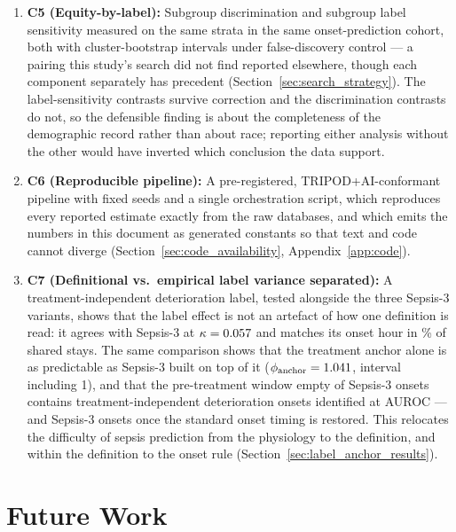 \begin{enumerate}
    \item \textbf{C5 (Equity-by-label):} Subgroup discrimination and subgroup
    label sensitivity measured on the same strata in the same
    onset-prediction cohort, both with cluster-bootstrap intervals under
    false-discovery control --- a pairing this study's search did not find
    reported elsewhere, though each component separately has precedent
    (Section~\ref{sec:search_strategy}). The label-sensitivity contrasts
    survive correction and the discrimination contrasts do not, so the
    defensible finding is about the completeness of the demographic record
    rather than about race; reporting either analysis without the other would
    have inverted which conclusion the data support.

    \item \textbf{C6 (Reproducible pipeline):} A pre-registered,
    TRIPOD+AI-conformant pipeline with fixed seeds and a single orchestration
    script, which reproduces every reported estimate exactly from the raw
    databases, and which emits the numbers in this document as generated
    constants so that text and code cannot diverge
    (Section~\ref{sec:code_availability}, Appendix~\ref{app:code}).

    \item \textbf{C7 (Definitional vs.\ empirical label variance separated):}
    A treatment-independent deterioration label, tested alongside the three
    Sepsis-3 variants, shows that the label effect is not an artefact of how one
    definition is read: it agrees with Sepsis-3 at $\kappa = 0.057$ and
    matches its onset hour in \pcPctExactMatchD\% of shared stays. The same
    comparison shows that the treatment anchor alone is as predictable as
    Sepsis-3 built on top of it ($\phi_{\text{anchor}} = 1.041$,
    interval including 1), and that the pre-treatment window empty of Sepsis-3
    onsets contains
    \pcPreTreatOnsetsVarD{} treatment-independent deterioration onsets
    identified at \pcPreTreatAurocPrimaryD{} AUROC --- and
    \pcPreTreatOnsetsVarF{} Sepsis-3 onsets once the standard onset timing is
    restored. This relocates the difficulty of sepsis prediction from the
    physiology to the definition, and within the definition to the onset rule
    (Section~\ref{sec:label_anchor_results}).
\end{enumerate}


\section{Future Work}

